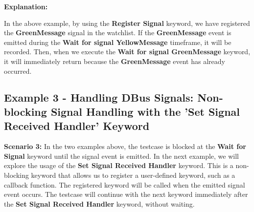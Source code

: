 
\textbf{Explanation:}

In the above example, by using the \textbf{Register Signal} keyword, we have registered the \textbf{GreenMessage} signal in the watchlist. If the \textbf{GreenMessage} event is emitted 
during the \textbf{Wait for signal YellowMessage} timeframe, it will be recorded. Then, when we execute the \textbf{Wait for signal GreenMessage} keyword, it will immediately return 
because the \textbf{GreenMessage} event has already occurred.


\hypertarget{description-example3}{%
\subsection{\texorpdfstring{\textbf{Example 3 - Handling DBus Signals: Non-blocking Signal Handling with the 'Set Signal Received Handler' Keyword}}{Example 3 - Handling DBus Signals: Non-blocking Signal Handling with the 'Set Signal Received Handler' Keyword}}\label{description-example3}}

\textbf{Scenario 3:}
In the two examples above, the testcase is blocked at the \textbf{Wait for Signal} keyword until the signal event is emitted. In the next example, we will explore the usage of 
the \textbf{Set Signal Received Handler} keyword. This is a non-blocking keyword that allows us to register a user-defined keyword, such as a callback function. The registered 
keyword will be called when the emitted signal event occurs. The testcase will continue with the next keyword immediately after the \textbf{Set Signal Received Handler} keyword, without waiting.



